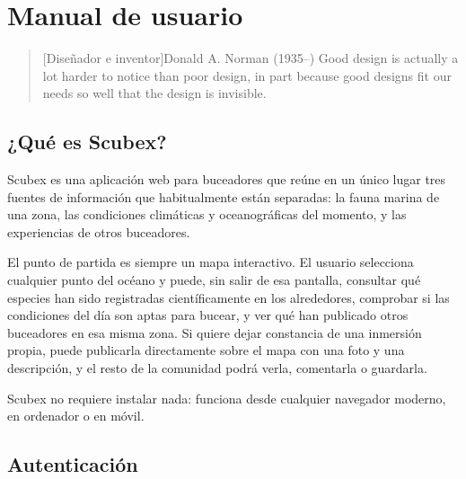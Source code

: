 \chapter{Manual de usuario}

\begin{quotation}[Diseñador e inventor]{Donald A. Norman (1935--)}
Good design is actually a lot harder to notice than poor design, in part because good designs fit our needs so well that the design is invisible.
\end{quotation}

\begin{abstract}
Este capítulo describe la interfaz de Scubex desde el punto de vista del usuario, presentando cada módulo de la aplicación por separado y detallando al final las consideraciones de diseño y experiencia que guían el conjunto.
\end{abstract}

\section{¿Qué es Scubex?}
\label{sec:manual-que-es}

Scubex es una aplicación web para buceadores que reúne en un único lugar tres fuentes de información que habitualmente están separadas: la fauna marina de una zona, las condiciones climáticas y oceanográficas del momento, y las experiencias de otros buceadores.

El punto de partida es siempre un mapa interactivo. El usuario selecciona cualquier punto del océano y puede, sin salir de esa pantalla, consultar qué especies han sido registradas científicamente en los alrededores, comprobar si las condiciones del día son aptas para bucear, y ver qué han publicado otros buceadores en esa misma zona. Si quiere dejar constancia de una inmersión propia, puede publicarla directamente sobre el mapa con una foto y una descripción, y el resto de la comunidad podrá verla, comentarla o guardarla.

Scubex no requiere instalar nada: funciona desde cualquier navegador moderno, en ordenador o en móvil.

\section{Autenticación}
\label{sec:manual-auth}

